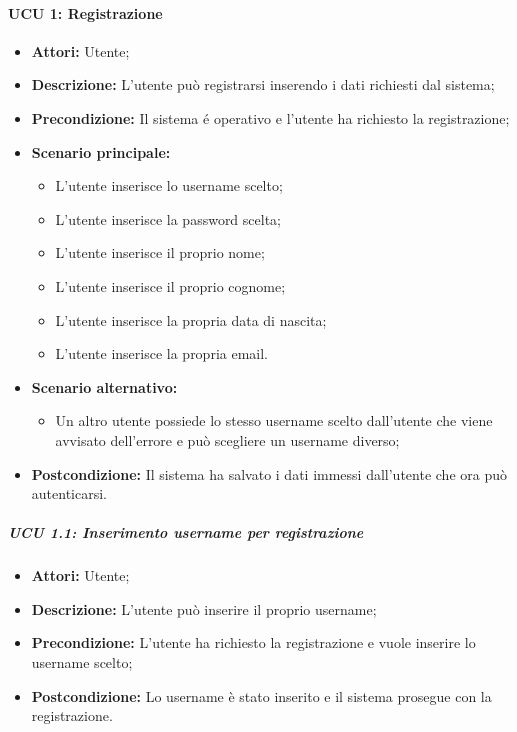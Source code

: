 \paragraph{UCU 1: Registrazione}
\begin{itemize}
	\item \textbf{Attori:} Utente;
	\item \textbf{Descrizione:} L'utente può registrarsi inserendo i dati richiesti dal sistema;
	\item \textbf{Precondizione:} Il sistema é operativo e l'utente ha richiesto la registrazione;
	\item \textbf{Scenario principale:}
	\begin{itemize}
		\item L'utente inserisce lo username scelto;
		\item L'utente inserisce la password scelta;
		\item L'utente inserisce il proprio nome;
		\item L'utente inserisce il proprio cognome;
		\item L'utente inserisce la propria data di nascita;
		\item L'utente inserisce la propria email.
	\end{itemize}
	\item \textbf{Scenario alternativo:}
	\begin{itemize}
		\item Un altro utente possiede lo stesso username scelto dall'utente che viene avvisato dell'errore e può scegliere un username diverso;
	\end{itemize}
	\item \textbf{Postcondizione:} Il sistema ha salvato i dati immessi dall'utente che ora può autenticarsi.
\end{itemize}

\subparagraph{UCU 1.1: Inserimento username per registrazione}
\begin{itemize}
	\item \textbf{Attori:} Utente;
	\item \textbf{Descrizione:} L'utente può inserire il proprio username;
	\item \textbf{Precondizione:} L'utente ha richiesto la registrazione e vuole inserire lo username scelto;
	\item \textbf{Postcondizione:} Lo username è stato inserito e il sistema prosegue con la registrazione.
\end{itemize}


